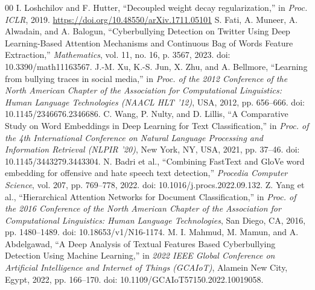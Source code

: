 \documentclass[journal]{IEEEtran}
\begin{document}
\begin{thebibliography}{00}
 I. Loshchilov and F. Hutter, ``Decoupled weight decay regularization,'' in \textit{Proc. ICLR}, 2019. \url{https://doi.org/10.48550/arXiv.1711.05101}
 S. Fati, A. Muneer, A. Alwadain, and A. Balogun, ``Cyberbullying Detection on Twitter Using Deep Learning-Based Attention Mechanisms and Continuous Bag of Words Feature Extraction,'' \textit{Mathematics}, vol. 11, no. 16, p. 3567, 2023. doi: 10.3390/math11163567.
 J.-M. Xu, K.-S. Jun, X. Zhu, and A. Bellmore, ``Learning from bullying traces in social media,'' in \textit{Proc. of the 2012 Conference of the North American Chapter of the Association for Computational Linguistics: Human Language Technologies (NAACL HLT '12)}, USA, 2012, pp. 656--666. doi: 10.1145/2346676.2346686.
 C. Wang, P. Nulty, and D. Lillis, ``A Comparative Study on Word Embeddings in Deep Learning for Text Classification,'' in \textit{Proc. of the 4th International Conference on Natural Language Processing and Information Retrieval (NLPIR '20)}, New York, NY, USA, 2021, pp. 37--46. doi: 10.1145/3443279.3443304.
 N. Badri et al., ``Combining FastText and GloVe word embedding for offensive and hate speech text detection,'' \textit{Procedia Computer Science}, vol. 207, pp. 769--778, 2022. doi: 10.1016/j.procs.2022.09.132.
 Z. Yang et al., ``Hierarchical Attention Networks for Document Classification,'' in \textit{Proc. of the 2016 Conference of the North American Chapter of the Association for Computational Linguistics: Human Language Technologies}, San Diego, CA, 2016, pp. 1480--1489. doi: 10.18653/v1/N16-1174.
 M. I. Mahmud, M. Mamun, and A. Abdelgawad, ``A Deep Analysis of Textual Features Based Cyberbullying Detection Using Machine Learning,'' in \textit{2022 IEEE Global Conference on Artificial Intelligence and Internet of Things (GCAIoT)}, Alamein New City, Egypt, 2022, pp. 166--170. doi: 10.1109/GCAIoT57150.2022.10019058.
\end{thebibliography}
\end{document}
